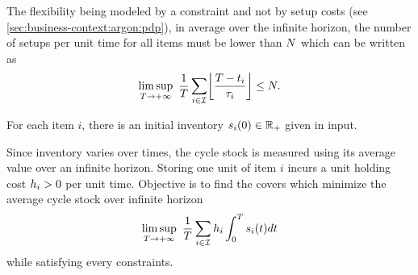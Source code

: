 The flexibility being modeled by a constraint and not by setup costs (see \cref{sec:business-context:argon:pdp}), in average over the infinite horizon, the number of setups per unit time for all items must be lower than $N$ which can be written as
\begin{equation}\label{eq:lot-size:single-line:deterministic:motivations:flexibility}
  \limsup_{\horizon\rightarrow+\infty}\ \frac{1}{\horizon} \sum_{i\in\REF} \left\lfloor\frac{\horizon-t_i}{\cover_i}\right\rfloor \le \nbsetups.
\end{equation}


For each item $i$, there is an initial inventory $\inventory_i\bracket{0}\in\RR_+$ given in input.


Since inventory varies over times, the cycle stock is measured using its average value over an infinite horizon.
Storing one unit of item $i$ incurs a unit holding cost $h_i>0$ per unit time.
Objective is to find the covers which minimize the average cycle stock over infinite horizon
\begin{equation}
  \limsup_{\horizon\rightarrow+\infty}\ \frac{1}{\horizon} \sum_{i\in\REF} \holding_i \int_0^{\horizon}\inventory_i\bracket{t}dt
\end{equation}
while satisfying every constraints.



